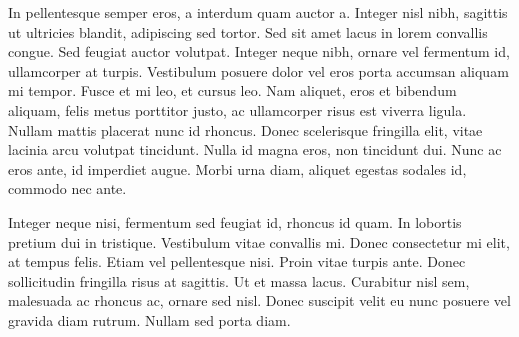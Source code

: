 In pellentesque semper eros, a interdum quam auctor a. Integer nisl nibh,
sagittis ut ultricies blandit, adipiscing sed tortor. Sed sit amet lacus in
lorem convallis congue. Sed feugiat auctor volutpat. Integer neque nibh, ornare
vel fermentum id, ullamcorper at turpis. Vestibulum posuere dolor vel eros porta
accumsan aliquam mi tempor. Fusce et mi leo, et cursus leo. Nam aliquet, eros et
bibendum aliquam, felis metus porttitor justo, ac ullamcorper risus est viverra
ligula. Nullam mattis placerat nunc id rhoncus. Donec scelerisque fringilla
elit, vitae lacinia arcu volutpat tincidunt. Nulla id magna eros, non tincidunt
dui. Nunc ac eros ante, id imperdiet augue. Morbi urna diam, aliquet egestas
sodales id, commodo nec ante.

Integer neque nisi, fermentum sed feugiat id, rhoncus id quam. In lobortis
pretium dui in tristique. Vestibulum vitae convallis mi. Donec consectetur mi
elit, at tempus felis. Etiam vel pellentesque nisi. Proin vitae turpis
ante. Donec sollicitudin fringilla risus at sagittis. Ut et massa
lacus. Curabitur nisl sem, malesuada ac rhoncus ac, ornare sed nisl. Donec
suscipit velit eu nunc posuere vel gravida diam rutrum. Nullam sed porta diam.
